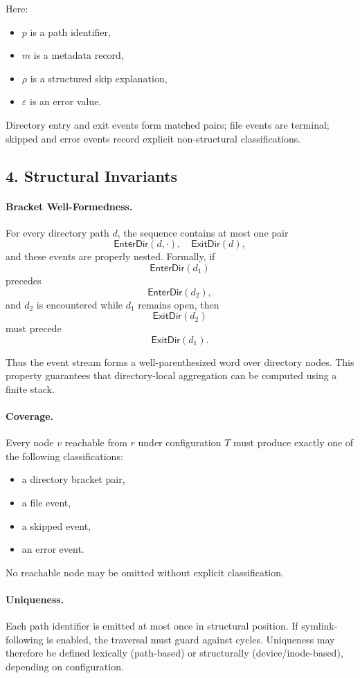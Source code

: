 Here:
\begin{itemize}
    \item $p$ is a path identifier,
    \item $m$ is a metadata record,
    \item $\rho$ is a structured skip explanation,
    \item $\varepsilon$ is an error value.
\end{itemize}

Directory entry and exit events form matched pairs; file events are terminal; 
skipped and error events record explicit non-structural classifications.

\subsection*{4. Structural Invariants}

\paragraph{Bracket Well-Formedness.}
For every directory path $d$, the sequence contains at most one pair
\[
\mathsf{EnterDir}(d, \cdot), \quad \mathsf{ExitDir}(d),
\]
and these events are properly nested. Formally, if
\[
\mathsf{EnterDir}(d_1)
\]
precedes
\[
\mathsf{EnterDir}(d_2),
\]
and $d_2$ is encountered while $d_1$ remains open, then
\[
\mathsf{ExitDir}(d_2)
\]
must precede
\[
\mathsf{ExitDir}(d_1).
\]

Thus the event stream forms a well-parenthesized word over directory nodes. 
This property guarantees that directory-local aggregation can be computed 
using a finite stack.

\paragraph{Coverage.}
Every node $v$ reachable from $r$ under configuration $T$ must produce 
exactly one of the following classifications:
\begin{itemize}
    \item a directory bracket pair,
    \item a file event,
    \item a skipped event,
    \item an error event.
\end{itemize}
No reachable node may be omitted without explicit classification.

\paragraph{Uniqueness.}
Each path identifier is emitted at most once in structural position. 
If symlink-following is enabled, the traversal must guard against cycles. 
Uniqueness may therefore be defined lexically (path-based) or structurally 
(device/inode-based), depending on configuration.

